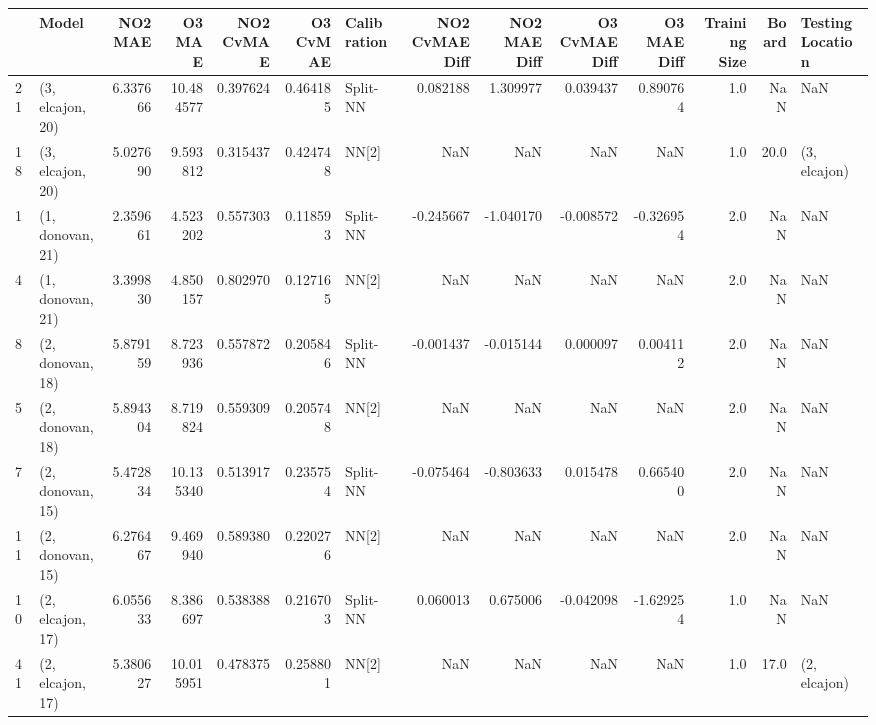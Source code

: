 \begin{tabular}{llrrrrlrrrrrrl}
\toprule
{} &             Model &   NO2 MAE &     O3 MAE &  NO2 CvMAE &  O3 CvMAE & Calibration &  NO2 CvMAE Diff &  NO2 MAE Diff &  O3 CvMAE Diff &  O3 MAE Diff &  Training Size &  Board & Testing Location \\
\midrule
21 &  (3, elcajon, 20) &  6.337666 &  10.484577 &   0.397624 &  0.464185 &    Split-NN &        0.082188 &      1.309977 &       0.039437 &     0.890764 &            1.0 &    NaN &              NaN \\
18 &  (3, elcajon, 20) &  5.027690 &   9.593812 &   0.315437 &  0.424748 &       NN[2] &             NaN &           NaN &            NaN &          NaN &            1.0 &   20.0 &     (3, elcajon) \\
1  &  (1, donovan, 21) &  2.359661 &   4.523202 &   0.557303 &  0.118593 &    Split-NN &       -0.245667 &     -1.040170 &      -0.008572 &    -0.326954 &            2.0 &    NaN &              NaN \\
4  &  (1, donovan, 21) &  3.399830 &   4.850157 &   0.802970 &  0.127165 &       NN[2] &             NaN &           NaN &            NaN &          NaN &            2.0 &    NaN &              NaN \\
8  &  (2, donovan, 18) &  5.879159 &   8.723936 &   0.557872 &  0.205846 &    Split-NN &       -0.001437 &     -0.015144 &       0.000097 &     0.004112 &            2.0 &    NaN &              NaN \\
5  &  (2, donovan, 18) &  5.894304 &   8.719824 &   0.559309 &  0.205748 &       NN[2] &             NaN &           NaN &            NaN &          NaN &            2.0 &    NaN &              NaN \\
7  &  (2, donovan, 15) &  5.472834 &  10.135340 &   0.513917 &  0.235754 &    Split-NN &       -0.075464 &     -0.803633 &       0.015478 &     0.665400 &            2.0 &    NaN &              NaN \\
11 &  (2, donovan, 15) &  6.276467 &   9.469940 &   0.589380 &  0.220276 &       NN[2] &             NaN &           NaN &            NaN &          NaN &            2.0 &    NaN &              NaN \\
10 &  (2, elcajon, 17) &  6.055633 &   8.386697 &   0.538388 &  0.216703 &    Split-NN &        0.060013 &      0.675006 &      -0.042098 &    -1.629254 &            1.0 &    NaN &              NaN \\
41 &  (2, elcajon, 17) &  5.380627 &  10.015951 &   0.478375 &  0.258801 &       NN[2] &             NaN &           NaN &            NaN &          NaN &            1.0 &   17.0 &     (2, elcajon) \\

\end{tabular}
